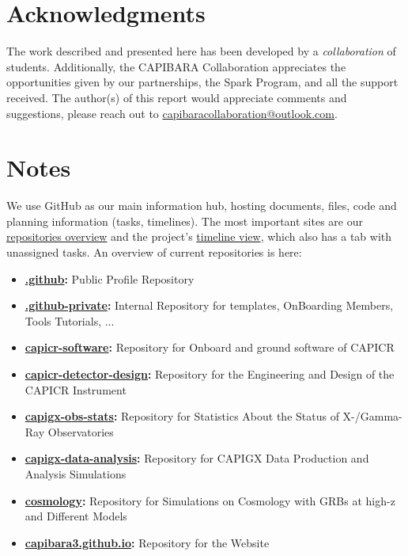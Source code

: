 \documentclass[arxiv,usenatbib]{iupartex}
\begin{document}
\section{Acknowledgments}
The work described and presented here has been developed by a \textit{collaboration} of students. Additionally, the CAPIBARA Collaboration appreciates the opportunities given by our partnerships, the Spark Program, and all the support received.
\vspace{0.5cm}
The author(s) of this report would appreciate comments and suggestions, please reach out to \href{mailto:capibaracollaboration@outlook.com}{capibaracollaboration@outlook.com}.

\section*{Notes}
We use GitHub as our main information hub, hosting documents, files, code and planning information (tasks, timelines). The most important sites are our \href{https://github.com/orgs/CAPIBARA3/repositories}{repositories overview} and the project's \href{https://github.com/orgs/CAPIBARA3/projects/1/views/1}{timeline view}, which also has a tab with unassigned tasks. An overview of current repositories is here:
\begin{itemize}
    \item \textbf{\href{https://github.com/capibara3/.github}{.github}:} Public Profile Repository
    \item \textbf{\href{https://github.com/capibara3/.github-private}{.github-private}:} Internal Repository for templates, OnBoarding Members, Tools Tutorials, ...
    \item \textbf{\href{https://github.com/capibara3/capicr-software}{capicr-software}:} Repository for Onboard and ground software of CAPICR
    \item \textbf{\href{https://github.com/capibara3/capicr-detector-design}{capicr-detector-design}:} Repository for the Engineering and Design of the CAPICR Instrument
    \item \textbf{\href{https://github.com/capibara3/capigx-obs-stats}{capigx-obs-stats}:} Repository for Statistics About the Status of X-/Gamma-Ray Observatories
    \item \textbf{\href{https://github.com/capibara3/capigx-data-analysis}{capigx-data-analysis}:} Repository for CAPIGX Data Production and Analysis Simulations
    \item \textbf{\href{https://github.com/capibara3/cosmology}{cosmology}:} Repository for Simulations on Cosmology with GRBs at high-z and Different Models
    \item \textbf{\href{https://github.com/capibara3/capibara3.github.io}{capibara3.github.io}:} Repository for the Website
\end{itemize}
\end{document}
